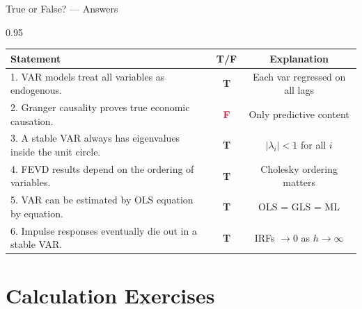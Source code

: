 \documentclass[9pt, aspectratio=169, t]{beamer}
\begin{document}
\begin{frame}{True or False? --- Answers}
    \begin{cminipage}{0.95\textwidth}
    \scriptsize
    \begin{center}
    \begin{tabular}{p{7.5cm}cc}
        \toprule
        \textbf{Statement} & \textbf{T/F} & \textbf{Explanation} \\
        \midrule
        1. VAR models treat all variables as endogenous. & \textcolor{Forest}{\textbf{T}} & {\tiny Each var regressed on all lags} \\[0.08cm]
        2. Granger causality proves true economic causation. & \textcolor{Crimson}{\textbf{F}} & {\tiny Only predictive content} \\[0.08cm]
        3. A stable VAR always has eigenvalues inside the unit circle. & \textcolor{Forest}{\textbf{T}} & {\tiny $|\lambda_i| < 1$ for all $i$} \\[0.08cm]
        4. FEVD results depend on the ordering of variables. & \textcolor{Forest}{\textbf{T}} & {\tiny Cholesky ordering matters} \\[0.08cm]
        5. VAR can be estimated by OLS equation by equation. & \textcolor{Forest}{\textbf{T}} & {\tiny OLS = GLS = ML} \\[0.08cm]
        6. Impulse responses eventually die out in a stable VAR. & \textcolor{Forest}{\textbf{T}} & {\tiny IRFs $\to 0$ as $h \to \infty$} \\
        \bottomrule
    \end{tabular}
    \end{center}
    \end{cminipage}
\end{frame}

\section{Calculation Exercises}
\end{document}
